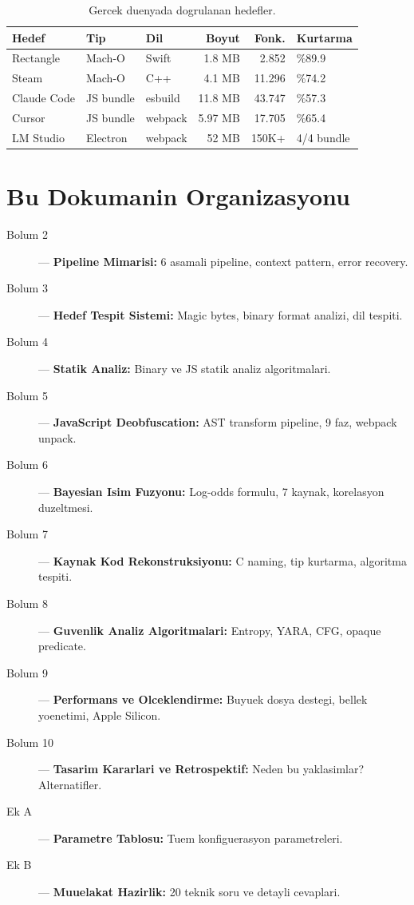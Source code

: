 \documentclass[12pt,a4paper,oneside]{book}
\theoremstyle{definition}
\begin{document}
\begin{table}[h]
\centering
\begin{tabular}{lllrrl}
\toprule
\textbf{\color{sectioncyan}Hedef} & \textbf{\color{sectioncyan}Tip} & \textbf{\color{sectioncyan}Dil} & \textbf{\color{sectioncyan}Boyut} & \textbf{\color{sectioncyan}Fonk.} & \textbf{\color{sectioncyan}Kurtarma} \\
\midrule
Rectangle & Mach-O & Swift & 1.8 MB & 2.852 & \%89.9 \\
Steam & Mach-O & C++ & 4.1 MB & 11.296 & \%74.2 \\
Claude Code & JS bundle & esbuild & 11.8 MB & 43.747 & \%57.3 \\
Cursor & JS bundle & webpack & 5.97 MB & 17.705 & \%65.4 \\
LM Studio & Electron & webpack & 52 MB & 150K+ & 4/4 bundle \\
\bottomrule
\end{tabular}
\caption{Gercek duenyada dogrulanan hedefler.}
\label{tab:targets}
\end{table}

\section{Bu Dokumanin Organizasyonu}

\begin{description}
\item[Bolum 2] --- \textbf{Pipeline Mimarisi:} 6 asamali pipeline, context pattern, error recovery.
\item[Bolum 3] --- \textbf{Hedef Tespit Sistemi:} Magic bytes, binary format analizi, dil tespiti.
\item[Bolum 4] --- \textbf{Statik Analiz:} Binary ve JS statik analiz algoritmalari.
\item[Bolum 5] --- \textbf{JavaScript Deobfuscation:} AST transform pipeline, 9 faz, webpack unpack.
\item[Bolum 6] --- \textbf{Bayesian Isim Fuzyonu:} Log-odds formulu, 7 kaynak, korelasyon duzeltmesi.
\item[Bolum 7] --- \textbf{Kaynak Kod Rekonstruksiyonu:} C naming, tip kurtarma, algoritma tespiti.
\item[Bolum 8] --- \textbf{Guvenlik Analiz Algoritmalari:} Entropy, YARA, CFG, opaque predicate.
\item[Bolum 9] --- \textbf{Performans ve Olceklendirme:} Buyuek dosya destegi, bellek yoenetimi, Apple Silicon.
\item[Bolum 10] --- \textbf{Tasarim Kararlari ve Retrospektif:} Neden bu yaklasimlar? Alternatifler.
\item[Ek A] --- \textbf{Parametre Tablosu:} Tuem konfiguerasyon parametreleri.
\item[Ek B] --- \textbf{Muuelakat Hazirlik:} 20 teknik soru ve detayli cevaplari.
\end{description}
\end{document}
